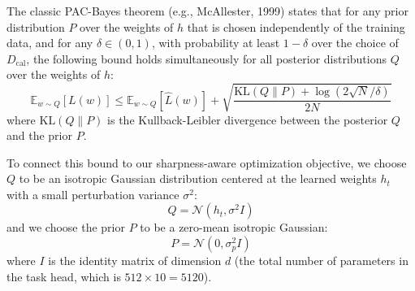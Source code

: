 \documentclass{article}
\theoremstyle{plain}
\theoremstyle{definition}
\theoremstyle{remark}
\begin{document}
The classic PAC-Bayes theorem (e.g., McAllester, 1999) states that for any prior distribution $P$ over the weights of $h$ that is chosen independently of the training data, and for any $\delta \in (0, 1)$, with probability at least $1-\delta$ over the choice of $D_{\text{cal}}$, the following bound holds simultaneously for all posterior distributions $Q$ over the weights of $h$:
\begin{equation}
    \mathbb{E}_{w \sim Q} [L(w)] \le \mathbb{E}_{w \sim Q} [\hat{L}(w)] + \sqrt{\frac{\text{KL}(Q \parallel P) + \log(2\sqrt{N}/\delta)}{2N}}
\end{equation}
where $\text{KL}(Q \parallel P)$ is the Kullback-Leibler divergence between the posterior $Q$ and the prior $P$.

To connect this bound to our sharpness-aware optimization objective, we choose $Q$ to be an isotropic Gaussian distribution centered at the learned weights $h_t$ with a small perturbation variance $\sigma^2$:
\begin{equation}
    Q = \mathcal{N}(h_t, \sigma^2 I)
\end{equation}
and we choose the prior $P$ to be a zero-mean isotropic Gaussian:
\begin{equation}
    P = \mathcal{N}(0, \sigma_p^2 I)
\end{equation}
where $I$ is the identity matrix of dimension $d$ (the total number of parameters in the task head, which is $512 \times 10 = 5120$).
\end{document}
